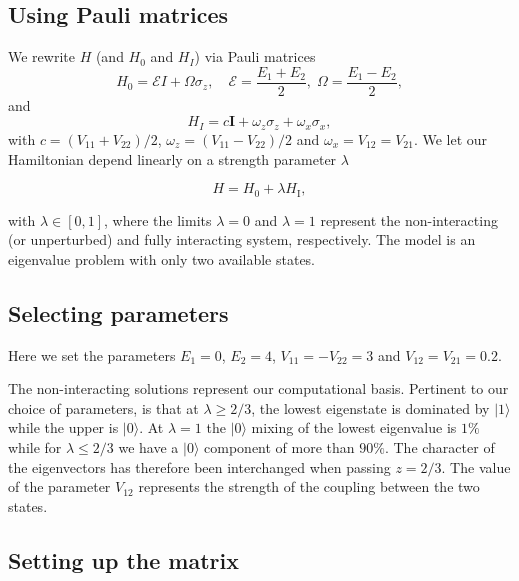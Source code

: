 \documentclass[%
oneside,                 %
final,                   %
10pt]{article}
\begin{document}
\subsection{Using Pauli matrices}

We rewrite $H$ (and $H_0$ and $H_I$)  via Pauli matrices
\[
H_0 = \mathcal{E} I + \Omega \sigma_z, \quad \mathcal{E} = \frac{E_1
  + E_2}{2}, \; \Omega = \frac{E_1-E_2}{2},
\]
and
\[
H_I = c \bm{I} +\omega_z\sigma_z + \omega_x\sigma_x,
\]
with $c = (V_{11}+V_{22})/2$, $\omega_z = (V_{11}-V_{22})/2$ and $\omega_x = V_{12}=V_{21}$.
We let our Hamiltonian depend linearly on a strength parameter $\lambda$

\[
H=H_0+\lambda H_\mathrm{I},
\]

with $\lambda \in [0,1]$, where the limits $\lambda=0$ and $\lambda=1$
represent the non-interacting (or unperturbed) and fully interacting
system, respectively.  The model is an eigenvalue problem with only
two available states.

\subsection{Selecting parameters}

Here we set the parameters $E_1=0$,
$E_2=4$, $V_{11}=-V_{22}=3$ and $V_{12}=V_{21}=0.2$.

The non-interacting solutions represent our computational basis.
Pertinent to our choice of parameters, is that at $\lambda\geq 2/3$,
the lowest eigenstate is dominated by $\vert 1\rangle$ while the upper
is $\vert 0 \rangle$. At $\lambda=1$ the $\vert 0 \rangle$ mixing of
the lowest eigenvalue is $1\%$ while for $\lambda\leq 2/3$ we have a
$\vert 0 \rangle$ component of more than $90\%$.  The character of the
eigenvectors has therefore been interchanged when passing $z=2/3$. The
value of the parameter $V_{12}$ represents the strength of the coupling
between the two states.

\subsection{Setting up the matrix}
\end{document}

